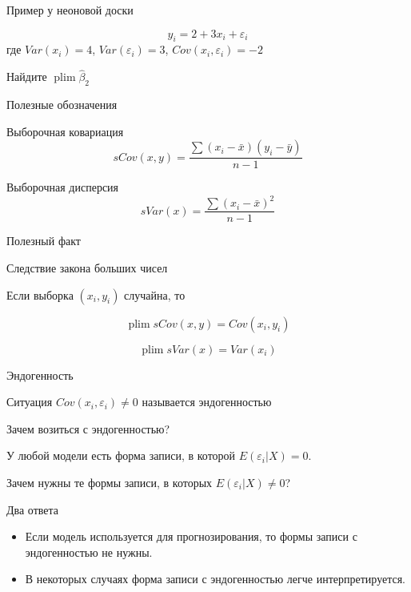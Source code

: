 \documentclass[ignorenonframetext,]{beamer}
\DeclareMathOperator{\plim}{plim}
\begin{document}
\begin{frame}{Пример у неоновой доски}

\[
y_i=2+3x_i + \varepsilon_i
\] где \(Var(x_i)=4\), \(Var( \varepsilon_i)=3\),
\(Cov(x_i , \varepsilon_i) = -2\)

Найдите \(\plim \hat{\beta}_2\)

\end{frame}

\begin{frame}{Полезные обозначения}

Выборочная ковариация \[
sCov(x,y)=\frac{\sum (x_i-\bar{x})(y_i-\bar{y})}{n-1}
\]

Выборочная дисперсия \[
sVar(x)=\frac{\sum (x_i-\bar{x})^2}{n-1}
\]

\end{frame}

\begin{frame}{Полезный факт}

Следствие закона больших чисел

Если выборка \((x_i,y_i)\) случайна, то

\[
\plim sCov(x,y) = Cov(x_i,y_i)
\]

\[
\plim sVar(x) = Var(x_i)
\]

\end{frame}

\begin{frame}{Эндогенность}

Ситуация \(Cov(x_i, \varepsilon_i) \neq 0\) называется эндогенностью

\end{frame}

\begin{frame}{Зачем возиться с эндогенностью?}

У любой модели есть форма записи, в которой \(E(\varepsilon_i|X)=0\).

Зачем нужны те формы записи, в которых \(E(\varepsilon_i|X) \neq 0\)?

\end{frame}

\begin{frame}{Два ответа}

\begin{itemize}
\item
  Если модель используется для прогнозирования, то формы записи с
  эндогенностью не нужны.
\item
  В некоторых случаях форма записи с эндогенностью легче
  интерпретируется.
\end{itemize}

\end{frame}
\end{document}
